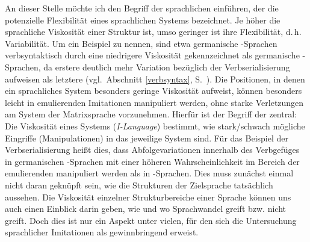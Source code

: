 An dieser Stelle möchte ich den Begriff der sprachlichen  einführen, der die potenzielle Flexibilität eines sprachlichen Systems bezeichnet. Je höher die sprachliche Viskosität einer Struktur ist, umso geringer ist ihre Flexibilität, d.\,h. Variabilität. Um ein Beispiel zu nennen, sind etwa germanische -Sprachen verbsyntaktisch durch eine niedrigere Viskosität gekennzeichnet als germanische -Sprachen, da erstere deutlich mehr Variation bezüglich der Verbserialisierung aufweisen als letztere (vgl.\, Abschnitt \ref{verbsyntax}, S.\, \pageref{verbsyntax}). Die Positionen, in denen ein sprachliches System besonders geringe Viskosität aufweist, können besonders leicht in emulierenden Imitationen manipuliert werden, ohne starke Verletzungen am System der Matrixsprache vorzunehmen. Hierfür ist der Begriff der  zentral: Die Viskosität eines Systems (\textit{I-Language}) 
bestimmt, wie stark/schwach mögliche Eingriffe (Manipulationen) in das jeweilige System sind. Für das Beispiel der Verbserialisierung heißt dies, dass Abfolgevariationen innerhalb des Verbgefüges in germanischen -Sprachen mit einer höheren Wahrscheinlichkeit im Bereich der emulierenden  manipuliert werden als in -Sprachen. Dies muss zunächst einmal nicht daran geknüpft sein, wie die Strukturen der Zielsprache tatsächlich aussehen. Die Viskosität einzelner Strukturbereiche einer Sprache können uns auch einen Einblick darin geben, wie und wo Sprachwandel greift bzw. nicht greift. Doch dies ist nur ein Aspekt unter vielen, für den sich die Untersuchung sprachlicher Imitationen als gewinnbringend erweist. 

